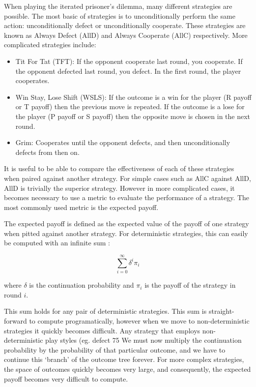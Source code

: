 \documentclass[a4paper,12pt]{article}
\begin{document}
When playing the iterated prisoner's dilemma, many different strategies are possible.
The most basic of strategies is to unconditionally perform the same action: unconditionally defect or unconditionally cooperate.
These strategies are known as Always Defect (AllD) and Always Cooperate (AllC) respectively.
More complicated strategies include:

\begin{itemize}
    \item Tit For Tat (TFT): If the opponent cooperate last round, you cooperate. If the opponent defected last round, you defect. In the first round, the player cooperates.
    \item Win Stay, Lose Shift (WSLS): If the outcome is a win for the player (R payoff or T payoff) then the previous move is repeated. If the outcome is a lose for the player (P payoff or S payoff) then the opposite move is chosen in the next round.
    \item Grim: Cooperates until the opponent defects, and then unconditionally defects from then on.
\end{itemize}

It is useful to be able to compare the effectiveness of each of these strategies when paired against another strategy.
For simple cases such as AllC against AllD, AllD is trivially the superior strategy.
However in more complicated cases, it becomes necessary to use a metric to evaluate the performance of a strategy.
The most commonly used metric is the expected payoff.

The expected payoff is defined as the expected value of the payoff of one strategy when pitted against another strategy.
For deterministic strategies, this can easily be computed with an infinite sum \cite{garciaandtraulsen}:

\begin{equation}
    \sum_{i=0}^{\infty} \delta^i \pi_i
\end{equation}

where $\delta$ is the continuation probability and $\pi_i$ is the payoff of the strategy in round $i$.

This sum holds for any pair of deterministic strategies.
This sum is straight-forward to compute programatically, however when we move to non-deterministic strategies it quickly becomes difficult.
Any strategy that employs non-deterministic play styles (eg. defect 75%
We must now multiply the continuation probability by the probability of that particular outcome, and we have to continue this `branch' of the outcome tree forever.
For more complex strategies, the space of outcomes quickly becomes very large, and consequently, the expected payoff becomes very difficult to compute.
\end{document}
